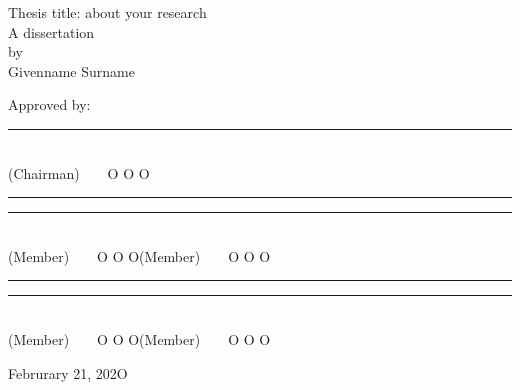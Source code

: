\thispagestyle{empty}

\begin{center}
{\fontsize{14pt}{14}\selectfont
Thesis title: about your research}\\[3cm]
{\fontsize{12pt}{12}\selectfont
A dissertation\\
by\\
Givenname Surname}\\[1.5cm]
\end{center}
{\fontsize{10pt}{10}\selectfont
Approved by:\\[1cm]
\rule{6cm}{0.5pt}\\[-0.1cm]
(Chairman)~~~~O O O\\[1cm]
\rule{6cm}{0.5pt}\hspace{1cm}\rule{6cm}{0.5pt}\\[-0.1cm]
(Member)~~~~O O O\hspace{4cm}(Member)~~~~O O O\\[1cm]
\rule{6cm}{0.5pt}\hspace{1cm}\rule{6cm}{0.5pt}\\[-0.1cm]
(Member)~~~~O O O\hspace{4cm}(Member)~~~~O O O\\[1cm]
}
\begin{center}
{\fontsize{12pt}{12}\selectfont
Februrary 21, 202O}
\end{center}

\newpage
